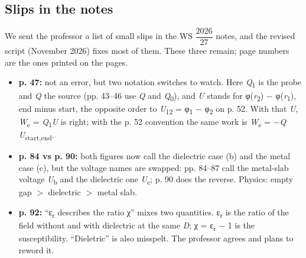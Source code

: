 \documentclass[11pt]{article}
\begin{document}
\begin{keepsection}
\section{Slips in the notes}

We sent the professor a list of small slips in the WS {\small\ensuremath{\dfrac{2026}{27}}} notes, and the revised script (November 2026) fixes most of them. These three remain; page numbers are the ones printed on the pages.

\begin{itemize}
\item \textbf{p. 47:} not an error, but two notation switches to watch. Here \textit{Q}\textsubscript{1} is the probe and \textit{Q} the source (pp. 43–46 use \textit{Q} and \textit{Q}\textsubscript{0}), and \textit{U} stands for φ(\textit{r}\textsubscript{2}) \ensuremath{-} φ(\textit{r}\textsubscript{1}), end minus start, the opposite order to \textit{U}\textsubscript{12} = φ\textsubscript{1} \ensuremath{-} φ\textsubscript{2} on p. 52. With that \textit{U}, \textit{W}\textsubscript{e} = \textit{Q}\textsubscript{1}\textit{U} is right; with the p. 52 convention the same work is \textit{W}\textsubscript{e} = \ensuremath{-}\textit{Q U}\textsubscript{start,end}.
\item \textbf{p. 84 vs p. 90:} both figures now call the dielectric case (b) and the metal case (c), but the voltage names are swapped: pp. 84–87 call the metal-slab voltage \textit{U}\textsubscript{b} and the dielectric one \textit{U}\textsubscript{c}; p. 90 does the reverse. Physics: empty gap \ensuremath{>} dielectric \ensuremath{>} metal slab.
\item \textbf{p. 92:} “ε\textsubscript{r} describes the ratio χ” mixes two quantities. ε\textsubscript{r} is the ratio of the field without and with dielectric at the same \textit{D}; χ = ε\textsubscript{r} \ensuremath{-} 1 is the susceptibility. “Dieletric” is also misspelt. The professor agrees and plans to reword it.
\end{itemize}
\end{keepsection}
\end{document}
